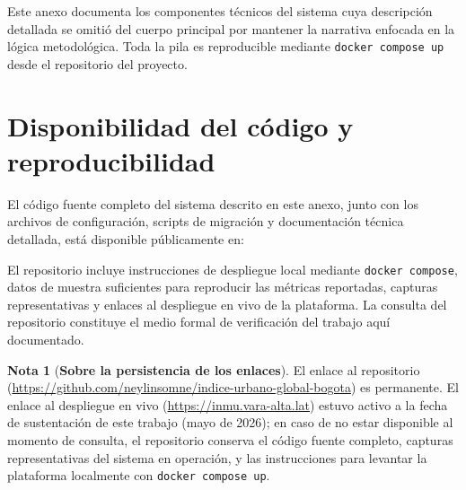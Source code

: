 \documentclass[12pt, a4paper, twoside, openright]{report}
\theoremstyle{plain}
\theoremstyle{definition}
\newtheorem{remark}{Nota}
\begin{document}
Este anexo documenta los componentes técnicos del sistema cuya descripción detallada se omitió del cuerpo principal por mantener la narrativa enfocada en la lógica metodológica. Toda la pila es reproducible mediante \texttt{docker compose up} desde el repositorio del proyecto.

\section*{Disponibilidad del código y reproducibilidad}

El código fuente completo del sistema descrito en este anexo, junto con los archivos de configuración, scripts de migración y documentación técnica detallada, está disponible públicamente en:

\begin{center}
\end{center}

El repositorio incluye instrucciones de despliegue local mediante \texttt{docker compose}, datos de muestra suficientes para reproducir las métricas reportadas, capturas representativas y enlaces al despliegue en vivo de la plataforma. La consulta del repositorio constituye el medio formal de verificación del trabajo aquí documentado.

\begin{remark}[\textbf{Sobre la persistencia de los enlaces}]
El enlace al repositorio (\url{https://github.com/neylinsomne/indice-urbano-global-bogota}) es permanente. El enlace al despliegue en vivo (\url{https://inmu.vara-alta.lat}) estuvo activo a la fecha de sustentación de este trabajo (mayo de 2026); en caso de no estar disponible al momento de consulta, el repositorio conserva el código fuente completo, capturas representativas del sistema en operación, y las instrucciones para levantar la plataforma localmente con \texttt{docker compose up}.
\end{remark}
\end{document}
